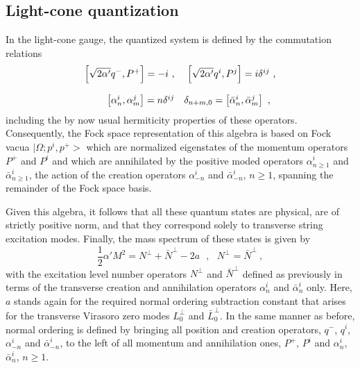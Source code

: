 \documentclass[a4paper,11pt]{article}
\begin{document}
\subsection{Light-cone quantization}
\label{Subsect7.5}

In the light-cone gauge, the quantized system is defined by the commutation
relations
\begin{equation}
\begin{array}{r l}
\left[\sqrt{2\alpha'}q^-,P^+\right]=-i\ ,&\
\left[\sqrt{2\alpha'}q^i,P^j\right]=i\delta^{ij}\ ,\\
 & \\
\left[\alpha^i_n,\alpha^j_m\right]=n\delta^{ij}&\delta_{n+m,0}=
\left[\bar{\alpha}^i_n,\bar{\alpha}^j_m\right]\ ,
\end{array}
\end{equation}
including the by now usual hermiticity properties of these operators. 
Consequently,
the Fock space representation of this algebra is based on Fock vacua
$|\Omega;p^i,p^+>$ which are normalized eigenstates of the momentum operators
$P^+$ and $P^i$ and which are annihilated by the positive moded operators
$\alpha^i_{n\ge 1}$ and $\bar{\alpha}^i_{n\ge 1}$, the action of the creation
operators $\alpha^i_{-n}$ and $\bar{\alpha}^i_{-n}$, $n\ge 1$, spanning the
remainder of the Fock space basis. 

Given this algebra, it follows that all these quantum states are physical,
are of strictly positive norm, and that they correspond solely to
transverse string excitation modes. Finally, the mass spectrum of these
states is given by
\begin{equation}
\frac{1}{2}\alpha' M^2=N^\perp+\bar{N}^\perp-2a\ \ \ ,\ \ \ 
N^\perp=\bar{N}^\perp\ ,
\end{equation}
with the excitation level number operators $N^\perp$ and $\bar{N}^\perp$
defined as previously in terms of the transverse creation and annihilation
operators $\alpha^i_n$ and $\bar{\alpha}^i_n$ only. Here, $a$ stands
again for the required normal ordering subtraction constant that arises
for the transverse Virasoro zero modes $L^\perp_0$ and $\bar{L}^\perp_0$.
In the same manner as before, normal ordering is defined by bringing all
position and creation operators, $q^-$, $q^i$, $\alpha^i_{-n}$
and $\bar{\alpha}^i_{-n}$, to the left of all momentum and annihilation 
ones, $P^+$, $P^i$ and $\alpha^i_n$, $\bar{\alpha}^i_n$, $n\ge 1$.
\end{document}
